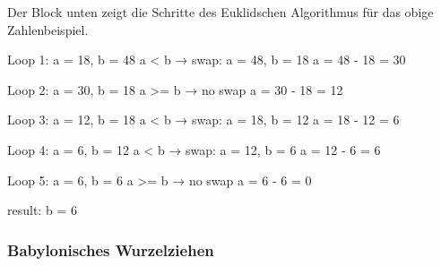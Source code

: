 \documentclass[
  letterpaper,
  DIV=11]{scrreprt}
\newenvironment{Shaded}{\begin{snugshade}}{\end{snugshade}}
\newcommand{\DecValTok}[1]{\textcolor[rgb]{0.68,0.00,0.00}{#1}}
\newcommand{\NormalTok}[1]{\textcolor[rgb]{0.00,0.23,0.31}{#1}}
\newcommand{\OperatorTok}[1]{\textcolor[rgb]{0.37,0.37,0.37}{#1}}
\begin{document}
Der Block unten zeigt die Schritte des Euklidschen Algorithmus für das
obige Zahlenbeispiel.

\begin{Shaded}
\begin{Highlighting}[]
\NormalTok{Loop }\DecValTok{1}\NormalTok{:}
\NormalTok{a }\OperatorTok{=} \DecValTok{18}\NormalTok{, b }\OperatorTok{=} \DecValTok{48} 
\NormalTok{a }\OperatorTok{\textless{}}\NormalTok{ b → swap: a }\OperatorTok{=} \DecValTok{48}\NormalTok{, b }\OperatorTok{=} \DecValTok{18}
\NormalTok{a }\OperatorTok{=} \DecValTok{48} \OperatorTok{{-}} \DecValTok{18} \OperatorTok{=} \DecValTok{30}

\NormalTok{Loop }\DecValTok{2}\NormalTok{: }
\NormalTok{a }\OperatorTok{=} \DecValTok{30}\NormalTok{, b }\OperatorTok{=} \DecValTok{18} 
\NormalTok{a }\OperatorTok{\textgreater{}=}\NormalTok{ b → no swap}
\NormalTok{a }\OperatorTok{=} \DecValTok{30} \OperatorTok{{-}} \DecValTok{18} \OperatorTok{=} \DecValTok{12}

\NormalTok{Loop }\DecValTok{3}\NormalTok{: }
\NormalTok{a }\OperatorTok{=} \DecValTok{12}\NormalTok{, b }\OperatorTok{=} \DecValTok{18} 
\NormalTok{a }\OperatorTok{\textless{}}\NormalTok{ b → swap: a }\OperatorTok{=} \DecValTok{18}\NormalTok{, b }\OperatorTok{=} \DecValTok{12}
\NormalTok{a }\OperatorTok{=} \DecValTok{18} \OperatorTok{{-}} \DecValTok{12} \OperatorTok{=} \DecValTok{6}

\NormalTok{Loop }\DecValTok{4}\NormalTok{:}
\NormalTok{a }\OperatorTok{=} \DecValTok{6}\NormalTok{, b }\OperatorTok{=} \DecValTok{12} 
\NormalTok{a }\OperatorTok{\textless{}}\NormalTok{ b → swap: a }\OperatorTok{=} \DecValTok{12}\NormalTok{, b }\OperatorTok{=} \DecValTok{6}
\NormalTok{a }\OperatorTok{=} \DecValTok{12} \OperatorTok{{-}} \DecValTok{6} \OperatorTok{=} \DecValTok{6}

\NormalTok{Loop }\DecValTok{5}\NormalTok{:}
\NormalTok{a }\OperatorTok{=} \DecValTok{6}\NormalTok{, b }\OperatorTok{=} \DecValTok{6} 
\NormalTok{a }\OperatorTok{\textgreater{}=}\NormalTok{ b → no swap}
\NormalTok{a }\OperatorTok{=} \DecValTok{6} \OperatorTok{{-}} \DecValTok{6} \OperatorTok{=} \DecValTok{0}

\NormalTok{result: b }\OperatorTok{=} \DecValTok{6}
\end{Highlighting}
\end{Shaded}

\subsubsection{Babylonisches
Wurzelziehen}\label{babylonisches-wurzelziehen}
\end{document}
